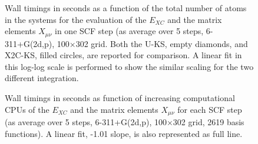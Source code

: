 \begin{figure}
\begin{center}
\end{center}
\caption{Wall timings in seconds as a function of the total number of atoms in the systems for the evaluation of the $E_{XC}$ and the matrix elements $X_{\mu \nu}$ in one SCF step (as average over 5 steps, 6-311+G(2d,p), 100$\times$302 grid.
  Both the U-KS, empty diamonds, and X2C-KS, filled circles, are reported for comparison. A linear fit in this log-log scale is performed to show the similar scaling for the two different integration. 
}
\label{fig:timing}     
\end{figure}

\begin{figure}
\begin{center}
\end{center}
\caption{
Wall timings in seconds as function of increasing computational CPUs of the $E_{XC}$ and the matrix 
elements $X_{\mu \nu}$ for each SCF step (as average over 5 steps, 6-311+G(2d,p), 100$\times$302 grid, 
2619 basis functions). A linear fit, -1.01 slope, is also represented as full line.
}
\label{fig:nodes}       
\end{figure}

